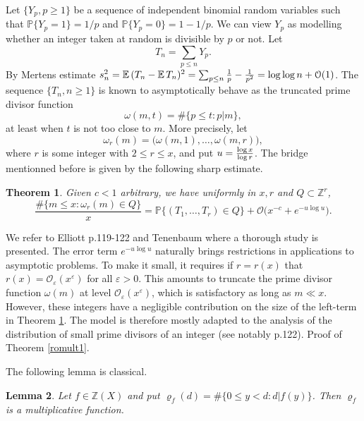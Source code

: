 \documentclass[11pt,draft,reqno]{amsart}
\makeatletter
\def\section{\@startsection{section}{1}%
     \z@{.7\linespacing\@plus\linespacing}{.5\linespacing}%
     {\bfseries%
     \centering
     }}
\newtheorem{theorem}{Theorem}[section]
\newtheorem{lemma}[theorem]{Lemma}
\theoremstyle{definition}
\theoremstyle{remarks}
\numberwithin{equation}{section}
\def \e{{\varepsilon}}
\def \o{{\omega}}
\def\P{{\mathcal P}}
\def\E{{\mathbb E \,}}
\def\P{{\mathbb P}}
\def\Z{{\mathbb Z}}
\makeatother
\begin{document}
  Let
$\{Y_p, p\ge 1\}$ be a sequence of independent binomial random variables such that
$\P\{Y_p=1\}=1/p$ and
$\P\{Y_p=0\}=1-1/p$. We can view $Y_p$ as modelling whether   an integer taken at random is divisible by $p$ or not. Let 
$$ T_n=\sum_{p\le n}  Y_p.  $$
By Mertens estimate
 $s_n^2=\E (T_n-\E T_n)^2= \sum_{p\le n} {1\over p}-{1\over p^2}=\log\log n +\mathcal O(1)$.  
 The sequence $\{T_n, n\ge 1\}$ is known to asymptotically behave as the truncated prime divisor function
$$\o(m,t)=\#\{ p\le t : p|m\} ,  $$
  at least when $t$ is not too close to $m$.  More precisely, let
$$\o_r(m)=\big( \o(m,1), \ldots, \o(m,r)\big), $$
where $r$ is some integer with $2\le r\le x$, and put $u={\log x\over \log r}$. The bridge mentionned before is given by the following sharp estimate.
\begin{theorem} \label{km}  Given $c<1$ arbitrary, we have uniformly in
$x,r
$ and
$Q\subset \Z^r$,
$$  \frac{\#\{ m\le x: \o_r(m)\in Q\}}{ x}=\P\big\{(T_1, \ldots, T_r)\in Q\big\}+ \mathcal O\big( x^{-c}+ 
e^{-u\log u}\big).
$$
\end{theorem} 
   We refer   to Elliott \cite{E} p.119-122 and   Tenenbaum \cite{Te} where a thorough study is presented.
 \vskip 2pt  The error term $e^{-u\log u}$  
naturally    brings  restrictions in   applications   to asymptotic problems.  To make it small,
it requires     if
$r=r(x)$ that
$  r(x)=\mathcal O _\e (x^\e)$   for all $\e>0$.   This amounts to truncate  the prime divisor function $\o(m )$  at level
$\mathcal O _\e (x^\e)$, which is satisfactory as long as $m\ll x$. However, these integers have a negligible contribution on the size
of    the left-term in Theorem  \ref{km}.   The  model is therefore mostly adapted to the analysis of the distribution of   small prime divisors
of an integer (see notably \cite{E} p.122). 
 \section{Proof  of Theorem \ref{romult1}.}   
 
  The following lemma  is   classical.  
\begin{lemma} \label{romult}Let $f\in \Z(X)$ and put $\varrho_f(d)=\#\big\{0\le y<d: d|f(y)\big\}$. Then $\varrho_f$ is a
multiplicative function.
\end{lemma}
 
\end{document}
